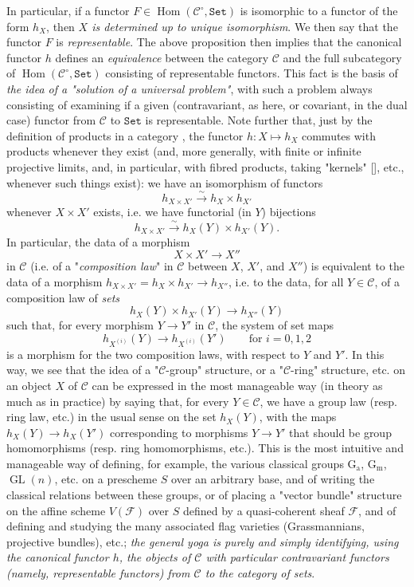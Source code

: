 In particular, if a functor $F\in\operatorname{Hom}(\mathcal{C}^\circ,\mathtt{Set})$ is isomorphic to a functor of the form $h_X$, then \emph{$X$ is determined up to unique isomorphism}.
We then say that the functor $F$ is \emph{representable}.
The above proposition then implies that the canonical functor $h$ defines an \emph{equivalence} between the category $\mathcal{C}$ and the full subcategory of $\operatorname{Hom}(\mathcal{C}^\circ,\mathtt{Set})$ consisting of representable functors.
This fact is the basis of \emph{the idea of a "solution of a universal problem"}, with such a problem always consisting of examining if a given (contravariant, as here, or covariant, in the dual case) functor from $\mathcal{C}$ to $\mathtt{Set}$ is representable.
Note further that, just by the definition of products in a category \cite{Gro1957}, the functor $h\colon X\mapsto h_X$ commutes with products whenever they exist (and, more generally, with finite or infinite projective limits, and, in particular, with fibred products, taking "kernels" [], etc., whenever such things exist): we have an isomorphism of functors
\[
    h_{X\times X'} \xrightarrow{\sim} h_X\times h_{X'}
\]
whenever $X\times X'$ exists, i.e. we have functorial (in $Y$) bijections
\[
    h_{X\times X'} \xrightarrow{\sim} h_X(Y)\times h_{X'}(Y).
\]
In particular, the data of a morphism
\[
    X\times X' \to X''
\]
in $\mathcal{C}$ (i.e. of a "\emph{composition law}" in $\mathcal{C}$ between $X$, $X'$, and $X''$) is equivalent to the data of a morphism $h_{X\times X'}=h_X\times h_{X'}\to h_{X''}$, i.e. to the data, for all $Y\in\mathcal{C}$, of a composition law of \emph{sets}
\[
    h_X(Y)\times h_{X'}(Y) \to h_{X''}(Y)
\]
such that, for every morphism $Y\to Y'$ in $\mathcal{C}$, the system of set maps
\[
    h_{X^{(i)}}(Y) \to h_{X^{(i)}}(Y')
    \qquad\text{for }i=0,1,2
\]
is a morphism for the two composition laws, with respect to $Y$ and $Y'$.
In this way, we see that the idea of a "$\mathcal{C}$-group" structure, or a "$\mathcal{C}$-ring" structure, etc. on an object $X$ of $\mathcal{C}$ can be expressed in the most manageable way (in theory as much as in practice) by saying that, for every $Y\in\mathcal{C}$, we have a group law (resp. ring law, etc.) in the usual sense on the set $h_X(Y)$, with the maps $h_X(Y)\to h_X(Y')$ corresponding to morphisms $Y\to Y'$ that should be group homomorphisms (resp. ring homomorphisms, etc.).
This is the most intuitive and manageable way of defining, for example, the various classical groups $\operatorname{G_a}$, $\operatorname{G_m}$, $\operatorname{GL}(n)$, etc. on a prescheme $S$ over an arbitrary base, and of writing the classical relations between these groups, or of placing a "vector bundle" structure on the affine scheme $V(\mathcal{F})$ over $S$ defined by a quasi-coherent sheaf $\mathcal{F}$, and of defining and studying the many associated flag varieties (Grassmannians, projective bundles), etc.;
\emph{the general yoga is purely and simply identifying, using the canonical functor $h$, the objects of $\mathcal{C}$ with particular contravariant functors (namely, representable functors) from $\mathcal{C}$ to the category of sets}.

